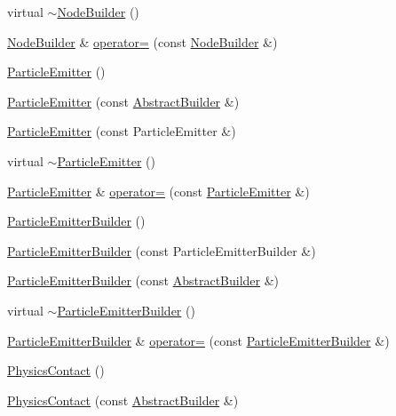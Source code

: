 \begin{DoxyCompactItemize}
\item 
virtual \hyperlink{namespacejli_ac5033296b7700d3610c8d224889de6c6}{$\sim$\+Node\+Builder} ()
\item 
\hyperlink{namespacejli_a1a43fda7f472452c5ded41130fe22e58}{Node\+Builder} \& \hyperlink{namespacejli_a290ea917337c90571eb741852c146180}{operator=} (const \hyperlink{namespacejli_a1a43fda7f472452c5ded41130fe22e58}{Node\+Builder} \&)
\item 
\hyperlink{namespacejli_ab1f3dc735d96dcdd2317b120e891fe1d}{Particle\+Emitter} ()
\item 
\hyperlink{namespacejli_a67f3ed93a69d21806745184d7cb360d4}{Particle\+Emitter} (const \hyperlink{classjli_1_1_abstract_builder}{Abstract\+Builder} \&)
\item 
\hyperlink{namespacejli_a94ad1ef2b2c9ae784aced6edf424e99f}{Particle\+Emitter} (const Particle\+Emitter \&)
\item 
virtual \hyperlink{namespacejli_a384ce52e7a05b4b95159acd26146f2fc}{$\sim$\+Particle\+Emitter} ()
\item 
\hyperlink{namespacejli_ab1f3dc735d96dcdd2317b120e891fe1d}{Particle\+Emitter} \& \hyperlink{namespacejli_ac893115fd88948e8e12c6f372b374892}{operator=} (const \hyperlink{namespacejli_ab1f3dc735d96dcdd2317b120e891fe1d}{Particle\+Emitter} \&)
\item 
\hyperlink{namespacejli_a924f0dead47ff62cb75f7887a1790c88}{Particle\+Emitter\+Builder} ()
\item 
\hyperlink{namespacejli_a544df46fc4d6629db7189ee3abaca6d1}{Particle\+Emitter\+Builder} (const Particle\+Emitter\+Builder \&)
\item 
\hyperlink{namespacejli_aaa81a58aa861c9250324078f76f6e673}{Particle\+Emitter\+Builder} (const \hyperlink{classjli_1_1_abstract_builder}{Abstract\+Builder} \&)
\item 
virtual \hyperlink{namespacejli_aacab585b70e497e16db1e432f1d9a8ce}{$\sim$\+Particle\+Emitter\+Builder} ()
\item 
\hyperlink{namespacejli_a924f0dead47ff62cb75f7887a1790c88}{Particle\+Emitter\+Builder} \& \hyperlink{namespacejli_a4ffcb7b3f0bada7c0e33cc9ffc502c11}{operator=} (const \hyperlink{namespacejli_a924f0dead47ff62cb75f7887a1790c88}{Particle\+Emitter\+Builder} \&)
\item 
\hyperlink{namespacejli_a87bec69a241d3a7d72c6a92035e457d7}{Physics\+Contact} ()
\item 
\hyperlink{namespacejli_ac44112ea315e999b0803a46be73ec2ea}{Physics\+Contact} (const \hyperlink{classjli_1_1_abstract_builder}{Abstract\+Builder} \&)

\end{DoxyCompactItemize}
